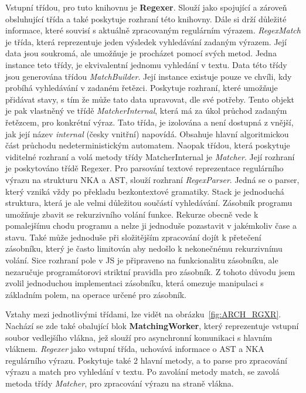Vstupní třídou, pro tuto knihovnu je \textbf{Regexer}. 
Slouží jako spojující a zároveň obsluhující třída a také poskytuje rozhraní této knihovny.
Dále si drží důležité informace, které souvisí s aktuálně zpracovaným regulárním výrazem.
\textit{RegexMatch} je třída, která reprezentuje jeden výsledek vyhledávání zadaným výrazem.
Její data jsou soukromá, ale umožňuje je procházet pomocí svých metod.
Jedna instance teto třídy, je ekvivalentní jednomu vyhledání v textu.
Data této třídy jsou generována třídou \textit{MatchBuilder}.
Její instance existuje pouze ve chvíli, kdy probíhá vyhledávání v zadaném řetězci.
Poskytuje rozhraní, které umožňuje přidávat stavy, s tím že může tato data upravovat, dle své potřeby.
Tento objekt je pak vlastněný ve třídě \textit{MatcherInternal}, která má za úkol průchod zadaným řetězcem, pro konkrétní výraz.
Tato třída, je izolována a není dostupná z vnější, jak její název \textit{internal} (česky vnitřní) napovídá.
Obsahuje hlavní algoritmickou část průchodu nedeterministickým automatem.
Naopak třídou, která poskytuje viditelné rozhraní a volá metody třídy MatcherInternal je \textit{Matcher}.
Její rozhraní je poskytováno třídě Regexer.
Pro parsování textové reprezentace regulárního výrazu na strukturu NKA a AST, slouží rozhraní \textit{RegexParser}.
Jedná se o parser, který vzniká vždy po překladu bezkontextové gramatiky.
Stack je jednoduchá struktura, která je ale velmi důležitou součástí vyhledávání.
Zásobník programu umožňuje zbavit se rekurzivního volání funkce.
Rekurze obecně vede k pomalejšímu chodu programu a nelze ji jednoduše pozastavit v jakémkoliv čase a stavu.
Také může jednoduše při složitějším zpracování dojít k přetečení zásobníku, který je často limitován aby nedošlo k nekonečnému rekurzivnímu volání.
Sice rozhraní pole v JS je připraveno na funkcionalitu zásobníku, ale nezaručuje programátorovi striktní pravidla pro zásobník. 
Z tohoto důvodu jsem zvolil jednoduchou implementaci zásobníku, která omezuje manipulaci s základním polem, na operace určené pro zásobník.

Vztahy mezi jednotlivými třídami, lze vidět na obrázku~\ref{fig:ARCH_RGXR}. 
Nachází se zde také obalující blok \textbf{MatchingWorker}, který reprezentuje vstupní soubor vedlejšího vlákna, jež slouží pro asynchronní komunikaci s hlavním vláknem.
\textit{Regexer} jako vstupní třída, uchovává informace o AST a NKA regulárního výrazu.
Poskytuje také 2 hlavní metody, a to parse pro zpracování výrazu a match pro vyhledání v textu.
Po zavolání metody match, se zavolá metoda třídy \textit{Matcher}, pro zpracování výrazu na straně vlákna.

